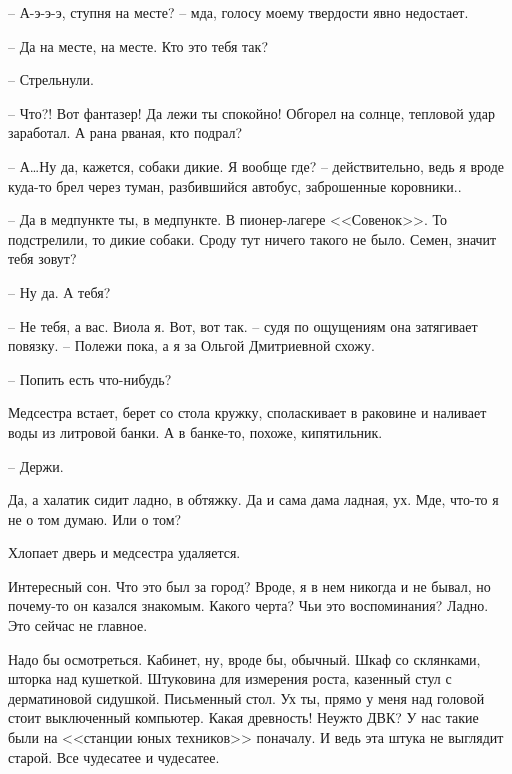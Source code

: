 \documentclass[a4paper]{book}
\begin{document}
-- А-э-э-э, ступня на месте? -- мда, голосу моему твердости явно недостает.

-- Да на месте, на месте. Кто это тебя так?

-- Стрельнули.  

-- Что?! Вот фантазер! Да лежи ты спокойно! Обгорел на солнце, тепловой удар заработал. А рана рваная, кто подрал?

-- А\ldots Ну да, кажется, собаки дикие. Я вообще где? -- действительно, ведь я вроде куда-то брел через туман, разбившийся автобус, заброшенные коровники.. 

-- Да в медпункте ты, в медпункте. В пионер-лагере <<Совенок>>. То подстрелили, то дикие собаки. Сроду тут ничего такого не было. Семен, значит тебя зовут?

-- Ну да. А тебя?

-- Не тебя, а вас. Виола я. Вот, вот так. -- судя по ощущениям она затягивает повязку. -- Полежи пока, а я за Ольгой Дмитриевной схожу. 

-- Попить есть что-нибудь? 

Медсестра встает, берет со стола кружку, споласкивает в раковине и наливает воды из литровой банки. А в банке-то, похоже, кипятильник.

-- Держи.

Да, а халатик сидит ладно, в обтяжку. Да и сама дама ладная, ух. Мде, что-то я не о том думаю. Или о том?

Хлопает дверь и медсестра удаляется. 

Интересный сон. Что это был за город? Вроде, я в нем никогда и не бывал, но почему-то он казался знакомым. Какого черта? Чьи это воспоминания? Ладно. Это сейчас не главное.

Надо бы осмотреться. Кабинет, ну, вроде бы, обычный. Шкаф со склянками, шторка над кушеткой. Штуковина для измерения роста, казенный стул с дерматиновой сидушкой. Письменный стол. Ух ты, прямо у меня над головой стоит выключенный компьютер. Какая древность! Неужто ДВК? У нас такие были на <<станции юных техников>> поначалу. И ведь эта штука не выглядит старой. Все чудесатее и чудесатее. 
\end{document}

